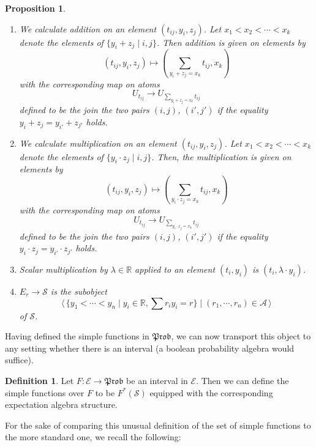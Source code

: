 \documentclass[a4paper]{amsproc}
\theoremstyle{plain}
\newtheorem{proposition}[theorem]{Proposition}
\theoremstyle{definition}
\newtheorem{definition}[theorem]{Definition}
\theoremstyle{remark}
\numberwithin{equation}{section}
\newcommand{\Prob}{\mathfrak{Prob}}
\newcommand{\la}{\langle\,}
\newcommand{\ra}{\,\rangle}
\begin{document}
\begin{proposition} \label{operations}
    \begin{enumerate}
        \item We calculate addition on an element $(t_{ij}, y_i, z_j)$. Let $x_1 < x_2 < \cdots < x_k$ denote the elements of $\{y_i + z_j \mid i,j \}$. Then addition is given on elements by
        \[
            (t_{ij},y_i,z_j) \mapsto (\sum_{y_i + z_j = x_k} t_{ij}, x_k)
        \]
        with the corresponding map on atoms
        \[
            U_{t_{ij}} \to U_{\sum_{y_i + z_j = x_k} t_{ij}}
        \]
        defined to be the join the two pairs $(i,j)$, $(i',j')$ if the equality $y_i + z_j = y_{i'} + z_{j'}$ holds.
        \item We calculate multiplication on an element $(t_{ij}, y_i, z_j)$. Let $x_1 < x_2 < \cdots < x_k$ denote the elements of $\{y_i \cdot z_j \mid i,j \}$. Then, the multiplication is given on elements by
        \[
            (t_{ij},y_i,z_j) \mapsto (\sum_{y_i \cdot z_j = x_k} t_{ij}, x_k)
        \]
        with the corresponding map on atoms
        \[
            U_{t_{ij}} \to U_{\sum_{y_i \cdot z_j = x_k} t_{ij}}
        \]
        defined to be the join the two pairs $(i,j)$, $(i',j')$ if the equality $y_i \cdot z_j = y_{i'} \cdot z_{j'}$ holds.
        \item Scalar multiplication by $\lambda \in \mathbb{R}$ applied to an element $(t_i,y_i)$ is $(t_i,\lambda \cdot y_i)$.
        \item $E_r \to \mathcal{S}$ is the subobject
        \[
            \la \{y_1 < \cdots < y_n \mid y_i \in \mathbb{R}, \sum r_i y_i = r \} \mid (r_1, \cdots, r_n) \in \mathcal{A} \ra
        \]
        of $\mathcal{S}$.
    \end{enumerate}
\end{proposition}

Having defined the simple functions in $\Prob$, we can now transport this object to any setting whether there is an interval (a boolean probability algebra would suffice).

\begin{definition}
    Let $F: \mathcal{E} \to \Prob$ be an interval in $\mathcal{E}$. Then we can define the simple functions over $F$ to be $F^*(\mathcal{S})$ equipped with the corresponding expectation algebra structure.
\end{definition}

For the sake of comparing this unusual definition of the set of simple functions to the more standard one, we recall the following:
\end{document}
